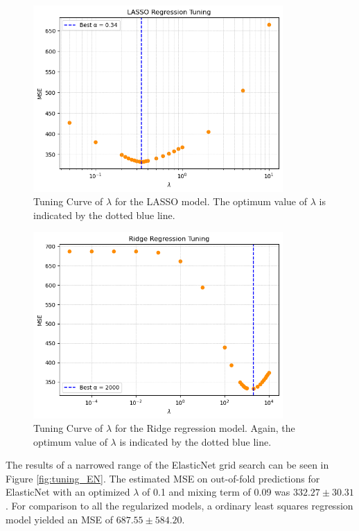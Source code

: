 \documentclass{article}      %
\begin{document}
\begin{figure}[h]
	\centering
	\includegraphics[width=0.85\textwidth]{figures/plt_tuning_L1.png}
	\caption{Tuning Curve of  \(\lambda \) for the LASSO model. The optimum value of \(\lambda \) is indicated by the dotted blue line.}
	\label{fig:tuning_L1}
\end{figure}

\begin{figure}[h]
	\centering
	\includegraphics[width=0.85\textwidth]{figures/plt_tuning_L2.png}
	\caption{Tuning Curve of  \(\lambda \) for the Ridge regression model. Again, the optimum value of \(\lambda \) is indicated by the dotted blue line.}
	\label{fig:tuning_L2}
\end{figure}

The results of a narrowed range of the ElasticNet grid search can be seen in Figure \ref{fig:tuning_EN}. The estimated MSE on out-of-fold predictions for ElasticNet with an optimized \(\lambda \) of 0.1 and mixing term of 0.09 was \( 332.27 \pm 30.31 \). For comparison to all the regularized models, a ordinary least squares regression model yielded an MSE of \(  687.55 \pm 584.20 \).
\end{document}
